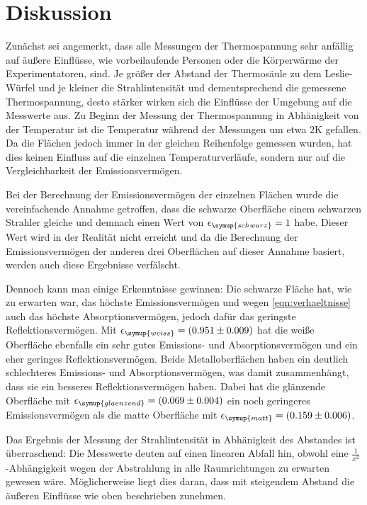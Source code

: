 \section{Diskussion}
\label{sec:Diskussion}
Zunächst sei angemerkt, dass alle Messungen der Thermospannung sehr anfällig auf
äußere Einflüsse, wie vorbeilaufende Personen oder die Körperwärme der Experimentatoren,
sind. Je größer der Abstand der Thermosäule zu dem Leslie-Würfel und je kleiner
die Strahlintensität und dementsprechend die gemessene Thermospannung, desto stärker
wirken sich die Einflüsse der Umgebung auf die Messwerte aus.
Zu Beginn der Messung der Thermospannung in Abhänigkeit von der Temperatur ist
die Temperatur während der Messungen um etwa $2 \si{\kelvin}$ gefallen. Da die Flächen
jedoch immer in der gleichen Reihenfolge gemessen wurden, hat dies keinen Einfluss
auf die einzelnen Temperaturverläufe, sondern nur auf die Vergleichbarkeit der
Emissionsvermögen.

Bei der Berechnung der Emissionsvermögen der einzelnen Flächen wurde die vereinfachende
Annahme getroffen, dass die schwarze Oberfläche einem schwarzen Strahler gleiche
und demnach einen Wert von $\epsilon_\symup{schwarz} = 1$ habe. Dieser Wert wird
in der Realität nicht erreicht und da die Berechnung der Emissionsvermögen der
anderen drei Oberflächen auf dieser Annahme basiert, werden auch diese Ergebnisse
verfälscht.

Dennoch kann man einige Erkenntnisse gewinnen:\newline
Die schwarze Fläche hat, wie zu erwarten war, das höchste Emissionsvermögen und
wegen \eqref{eqn:verhaeltnisse} auch das höchste Absorptionsvermögen, jedoch dafür das geringste
Reflektionsvermögen.
Mit $\epsilon_\symup{weiss} = (0.951\pm0.009)$ hat die weiße Oberfläche ebenfalls
ein sehr gutes Emissions- und Absorptionsvermögen und ein eher geringes Reflektionsvermögen.
Beide Metalloberflächen haben ein deutlich schlechteres Emissions- und Absorptionsvermögen,
was damit zusammenhängt, dass sie ein besseres Reflektionsvermögen haben.
Dabei hat die glänzende Oberfläche mit $\epsilon_\symup{glaenzend} = (0.069\pm0.004)$
ein noch geringeres Emissionsvermögen als die matte Oberfläche mit
$\epsilon_\symup{matt} = (0.159\pm0.006)$.

Das Ergebnis der Messung der Strahlintensität in Abhänigkeit des Abstandes ist
überraschend: Die Messwerte deuten auf einen linearen Abfall hin, obwohl eine
$\frac{1}{x^2}$-Abhängigkeit wegen der Abstrahlung in alle Raumrichtungen zu
erwarten gewesen wäre. Möglicherweise liegt dies daran, dass mit steigendem Abstand
die äußeren Einflüsse wie oben beschrieben zunehmen.

